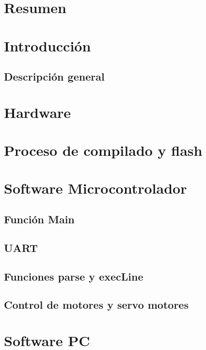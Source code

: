 \section{Resumen} %
\section{Introducción} %
  
  \subsection{Descripción general} %
    
\section{Hardware} %

\section{Proceso de compilado y flash}

\section{Software Microcontrolador}
\subsection{Función Main}


\subsection{UART}\label{UART}


\subsection{Funciones parse y execLine}

\subsection{Control de motores y servo motores}


\section{Software PC}
